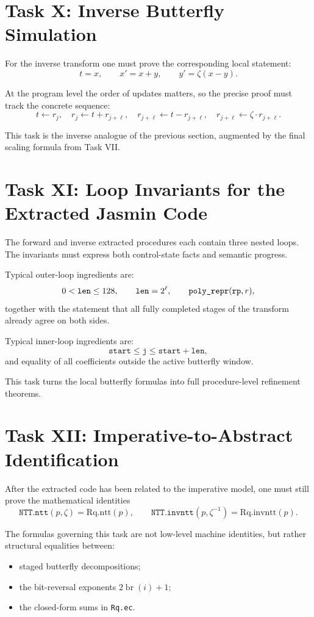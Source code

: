 \documentclass[11pt]{article}
\newcommand{\code}[1]{\text{\texttt{#1}}}
\begin{document}
\section{Task X: Inverse Butterfly Simulation}

For the inverse transform one must prove the corresponding local statement:
\[
t = x,
\qquad
x' = x + y,
\qquad
y' = \zeta(x - y).
\]

At the program level the order of updates matters, so the precise proof must
track the concrete sequence:
\[
t \leftarrow r_j,\quad
r_j \leftarrow t + r_{j+\ell},\quad
r_{j+\ell} \leftarrow t - r_{j+\ell},\quad
r_{j+\ell} \leftarrow \zeta \cdot r_{j+\ell}.
\]

This task is the inverse analogue of the previous section, augmented by the
final scaling formula from Task VII.

\section{Task XI: Loop Invariants for the Extracted Jasmin Code}

The forward and inverse extracted procedures each contain three nested loops.
The invariants must express both control-state facts and semantic progress.

Typical outer-loop ingredients are:
\[
0 < \texttt{len} \le 128,
\qquad
\texttt{len} = 2^\ell,
\qquad
\code{poly\_repr}(\texttt{rp}, r),
\]
together with the statement that all fully completed stages of the transform
already agree on both sides.

Typical inner-loop ingredients are:
\[
\texttt{start} \le \texttt{j} \le \texttt{start} + \texttt{len},
\]
and equality of all coefficients outside the active butterfly window.

This task turns the local butterfly formulas into full procedure-level
refinement theorems.

\section{Task XII: Imperative-to-Abstract Identification}

After the extracted code has been related to the imperative model, one must
still prove the mathematical identities
\[
\texttt{NTT.ntt}(p,\zeta) = \mathrm{Rq.ntt}(p),
\qquad
\texttt{NTT.invntt}(p,\zeta^{-1}) = \mathrm{Rq.invntt}(p).
\]

The formulas governing this task are not low-level machine identities, but
rather structural equalities between:
\begin{itemize}
\item staged butterfly decompositions;
\item the bit-reversal exponents \(2\operatorname{br}(i)+1\);
\item the closed-form sums in \texttt{Rq.ec}.
\end{itemize}
\end{document}
